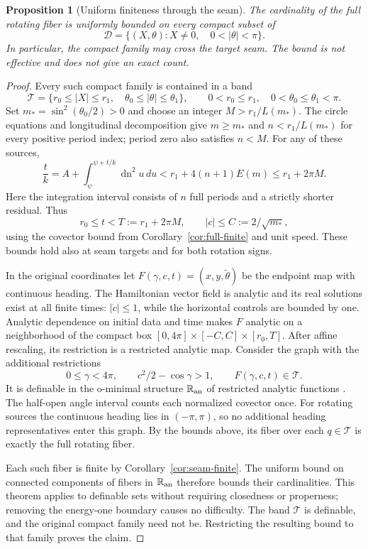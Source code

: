 \documentclass[11pt,a4paper]{article}
\newtheorem{proposition}[theorem]{Proposition}
\theoremstyle{remark}\newtheorem{remark}[theorem]{Remark}
\newcommand{\dn}{\operatorname{dn}}
\begin{document}
\begin{proposition}[Uniform finiteness through the seam]\label{prop:uniform-finite}
The cardinality of the full rotating fiber is uniformly bounded on every
compact subset of
\[
 \mathcal D=\{(X,\theta):X\ne0,\quad 0<|\theta|<\pi\}.
\]
In particular, the compact family may cross the target seam. The bound
is not effective and does not give an exact count.
\end{proposition}
\begin{proof}
Every such compact family is contained in a band
\[
 \mathcal T=\{r_0\le|X|\le r_1,\quad
                  \theta_0\le|\theta|\le\theta_1\},
 \qquad 0<r_0\le r_1,\quad 0<\theta_0\le\theta_1<\pi.
\]
Set $m_*=\sin^2(\theta_0/2)>0$ and choose an integer
$M>r_1/L(m_*)$. The circle equations and longitudinal decomposition
give $m\ge m_*$ and $n<r_1/L(m_*)$ for every positive period index;
period zero also satisfies $n<M$. For any of these sources,
\[
 \frac tk=A+\int_\psi^{\psi+t/k}\dn^2u\,du
       <r_1+4(n+1)E(m)\le r_1+2\pi M.
\]
Here the integration interval consists of $n$ full periods and a
strictly shorter residual. Thus
\[
 r_0\le t< T:=r_1+2\pi M,\qquad |c|\le C:=2/\sqrt{m_*},
\]
using the covector bound from Corollary~\ref{cor:full-finite} and unit
speed. These bounds hold also at seam targets and for both rotation signs.

In the original coordinates let $F(\gamma,c,t)=(x,y,\widetilde\theta)$
be the endpoint map with continuous heading. The Hamiltonian vector
field is analytic and its real solutions exist at all finite times:
$|\dot c|\le1$, while the horizontal controls are bounded by one.
Analytic dependence on initial data and time makes $F$ analytic on a
neighborhood of the compact box
$[0,4\pi]\times[-C,C]\times[r_0,T]$.
After affine rescaling, its restriction is a restricted analytic map.
Consider the graph with the additional restrictions
\[
 0\le\gamma<4\pi,\qquad c^2/2-\cos\gamma>1,
 \qquad F(\gamma,c,t)\in\mathcal T.
\]
It is definable in the o-minimal structure $\mathbb R_{\rm an}$ of
restricted analytic functions \cite[Section 2]{VDM}. The half-open
angle interval counts each normalized covector once. For rotating
sources the continuous heading lies in $(-\pi,\pi)$, so no additional
heading representatives enter this graph. By the bounds above, its
fiber over each $q\in\mathcal T$ is exactly the full rotating fiber.

Each such fiber is finite by Corollary~\ref{cor:seam-finite}. The
uniform bound on connected components of fibers in
$\mathbb R_{\rm an}$ \cite[4.4]{VDM} therefore bounds their cardinalities.
This theorem applies to definable sets without requiring closedness or
properness; removing the energy-one boundary causes no difficulty.
The band $\mathcal T$ is definable, and the original compact family
need not be. Restricting the resulting bound to that family proves
the claim.
\end{proof}
\end{document}
